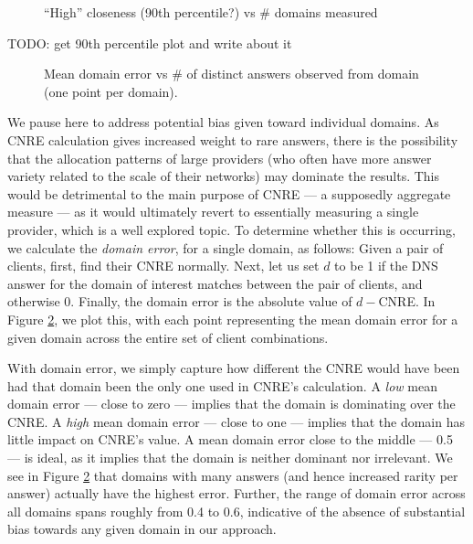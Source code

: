 \begin{figure}
    \caption{“High” closeness (90th percentile?) vs \# domains measured}
    \label{fig:90cnre}
\end{figure}

TODO: get 90th percentile plot and write about it

\begin{figure}
    \caption{Mean domain error vs \# of distinct answers observed from domain
    (one point per domain).}
    \label{fig:domerr}
\end{figure}

We pause here to address potential bias given toward individual domains. As CNRE
calculation gives increased weight to rare answers, there is the possibility
that the allocation patterns of large providers (who often have more answer
variety related to the scale of their networks) may dominate the results. This
would be detrimental to the main purpose of CNRE --- a supposedly aggregate
measure --- as it would ultimately revert to essentially measuring a single
provider, which is a well explored topic. To determine whether this is occurring,
we calculate the \emph{domain error}, for a single domain, as follows: Given a
pair of clients, first, find their CNRE normally. Next, let us set $d$ to be 1
if the DNS answer for the domain of interest matches between the pair of
clients, and otherwise 0. Finally, the domain error is the absolute value of \(d
- \)CNRE. In Figure \ref{fig:domerr}, we plot this, with each
point representing the mean domain error for a given domain across
the entire set of client combinations. 

With domain error, we simply capture how different the CNRE would have
been had that domain been the only one used in CNRE's calculation. A \emph{low}
mean domain
error --- close to zero --- implies that the domain is dominating over the
CNRE. A \emph{high} mean domain error --- close to one --- implies that the domain has little impact
on CNRE's value. A mean domain error close to the middle --- 0.5 --- is ideal,
as it implies that the domain is neither dominant nor irrelevant. We see in
Figure \ref{fig:domerr} that domains with many answers (and hence increased rarity per
answer) actually have the highest error. Further, the range of domain error
across all domains spans roughly from 0.4 to 0.6, indicative of the absence of
substantial bias towards any given domain in our approach.
